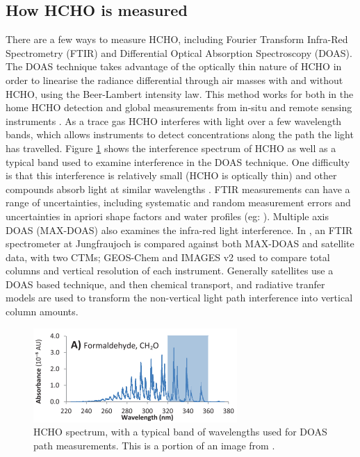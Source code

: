   \subsection{How HCHO is measured}
    There are a few ways to measure HCHO, including Fourier Transform Infra-Red Spectrometry (FTIR) and Differential Optical Absorption Spectroscopy (DOAS).
    The DOAS technique takes advantage of the optically thin nature of HCHO in order to linearise the radiance differential through air masses with and without HCHO, using the Beer-Lambert intensity law.
    This method works for both in the home HCHO detection and global measurements from in-situ and remote sensing instruments \citep{Guenther1995, Abad2015, Davenport2015}.
    As a trace gas HCHO interferes with light over a few wavelength bands, which allows instruments to detect concentrations along the path the light has travelled.
    Figure \ref{ch_LitRev:fig:HCHOSpectrum} shows the interference spectrum of HCHO as well as a typical band used to examine interference in the DOAS technique.
    One difficulty is that this interference is relatively small (HCHO is optically thin) and other compounds absorb light at similar wavelengths \citep{Davenport2015}.
    FTIR measurements can have a range of uncertainties, including systematic and random measurement errors and uncertainties in apriori shape factors and water profiles (eg: \citet{Franco2015}).
    Multiple axis DOAS (MAX-DOAS) also examines the infra-red light interference.
    In \citet{Franco2015}, an FTIR spectrometer at Jungfraujoch is compared against both MAX-DOAS and satellite data, with two CTMs; GEOS-Chem and IMAGES v2 used to compare total columns and vertical resolution of each instrument.
    Generally satellites use a DOAS based technique, and then chemical transport, and radiative tranfer models are used to transform the non-vertical light path interference into vertical column amounts.
    
    \begin{figure}
      \includegraphics{Figures/HCHO/HCHOAbsorbanceDavenport.png}
      \caption{ HCHO spectrum, with a typical band of wavelengths used for DOAS path measurements.
        This is a portion of an image from \citet{Davenport2015}.}
      \label{ch_LitRev:fig:HCHOSpectrum}
    \end{figure}
    
